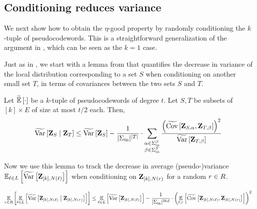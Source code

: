 \subsection{Conditioning reduces variance}

We next show how to obtain the $\eta$-good property by randomly conditioning the $k$-tuple of pseudocodewords. This is a straightforward generalization of the argument in \cite{JST23}, which can be seen as the $k=1$ case.

Just as in \cite{JST23}, we start with a lemma from \cite{BRS11} that quantifies the decrease in variance of the local distribution corresponding to a set $S$ when conditioning on another small set $T$, in terms of covariances between the two sets $S$ and $T$.

\begin{lemma}
	Let $\tildeEx{\cdot}$ be a $k$-tuple of pseudocodewords of degree $t$. Let $S,T$ be subsets of $[k]\times E$ of size at most $t/2$ each. Then,
	\[
		\tildeVar{\zee_S \given \zee_T} \leq \tildeVar{\zee_S} - \frac{1}{|\Sigma_{\inn}|^{|T|}} \cdot \sum_{\substack{\alpha \in \Sigma_{\inn}^S \\ \beta \in \Sigma_{\inn}^T}} \frac{\inparen{\tildeCov{\zee_{S,\alpha}}{\zee_{T,\beta}}}^2}{\tildeVar{\zee_{T,\beta}}}
	\]
\end{lemma}

Now we use this lemma to track the decrease in average (pseudo-)variance $\Ex{\li \in L}{\tildeVar{\zee_{[k],N(\li)}}}$ when conditioning on ${ \mathbf{Z} }_{[k],N({ r })}$ for a random ${ r }\in R$.

\begin{lemma}\label{lem:avg_conditioning}
	\begin{align*}
		\Ex{\ri\in R}{\Ex{\li\in L}{\tildeVar{\zee_{[k],N(\li)} \given \zee_{[k],N(\ri)}}}} \leq \Ex{\li\in L}{\tildeVar{\zee_{[k],N(\li)}}} - \frac{1}{|\Sigma_{\inn}|^{3kd}} \cdot \inparen{\Ex{\li,\ri}{\tildeCov{\zee_{[k],N(\li)}}{\zee_{[k],N(\ri)}}}}^2
	\end{align*}
\end{lemma}

